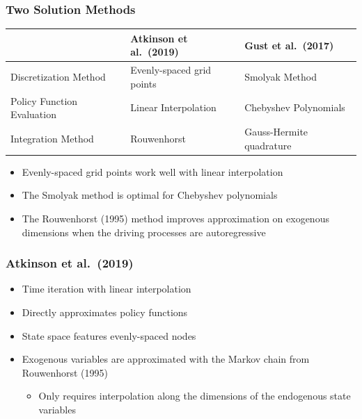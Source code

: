 \documentclass[11pt]{beamer}
\begin{document}
\begin{frame}\frametitle{Two Solution Methods}
\begin{table}\scriptsize
    \renewcommand*{\arraystretch}{1.4}
    \setlength{\tabcolsep}{6pt}      
  \begin{tabularx}{\textwidth}{l | X | X}
    \hline
    & \textbf{Atkinson et al.\ (2019)} & \textbf{Gust et al.\ (2017)} \\ \hline
    	Discretization Method & Evenly-spaced grid points & Smolyak Method\\
	Policy Function Evaluation & Linear Interpolation & Chebyshev Polynomials \\
	Integration Method & Rouwenhorst & Gauss-Hermite quadrature  \\ \hline
\end{tabularx}
\end{table}\normalsize
\begin{itemize}\setlength{\itemsep}{10pt}
\item  <2-|handout:1>Evenly-spaced grid points work well with linear interpolation
\item  <3-|handout:1>The Smolyak method is optimal for Chebyshev polynomials
\item  <4-|handout:1>The Rouwenhorst (1995) method improves approximation on exogenous dimensions when the driving processes are autoregressive
\end{itemize}

\end{frame}
\begin{frame}\frametitle{Atkinson et al.\ (2019)}
\begin{itemize}\setlength{\itemsep}{10pt}
\item <1-|handout:1> Time iteration with linear interpolation
\item <2-|handout:1>Directly approximates policy functions
\item <3-|handout:1> State space features evenly-spaced nodes
\item<4-|handout:1>  Exogenous variables are approximated with the Markov chain from Rouwenhorst (1995)
  \begin{itemize}\setlength{\itemsep}{4pt}
\item Only requires interpolation along the dimensions of the endogenous state variables
\end{itemize}
\end{itemize}
\end{frame}
\end{document}
